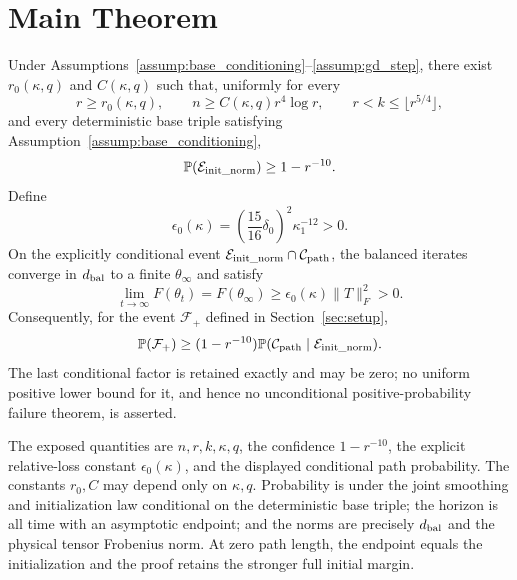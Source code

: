 \section{Main Theorem}\label{sec:main-theorem}

\begin{theorem}
\label{thm:main}
Under Assumptions~\ref{assump:base_conditioning}--\ref{assump:gd_step}, there
exist $r_0(\kappa,q)$ and $C(\kappa,q)$ such that, uniformly for every
\[
  r\ge r_0(\kappa,q),\qquad
  n\ge C(\kappa,q)r^4\log r,\qquad
  r<k\le\lfloor r^{5/4}\rfloor,
\]
and every deterministic base triple satisfying
Assumption~\ref{assump:base_conditioning},
\[
  \mathbb P(\mathcal E_{\rm init\_norm})\ge1-r^{-10}.
\]
Define
\[
  \epsilon_0(\kappa)
  =\left(\frac{15}{16}\delta_0\right)^2\kappa_1^{-12}>0.
\]
On the explicitly conditional event
$\mathcal E_{\rm init\_norm}\cap\mathcal C_{\rm path}$, the balanced iterates
converge in $d_{\rm bal}$ to a finite $\theta_\infty$ and satisfy
\[
  \lim_{t\to\infty}F(\theta_t)
  =F(\theta_\infty)
  \ge\epsilon_0(\kappa)\|T\|_F^2>0.
\]
Consequently, for the event $\mathcal F_+$ defined in Section~\ref{sec:setup},
\[
  \mathbb P(\mathcal F_+)
  \ge(1-r^{-10})
    \mathbb P(\mathcal C_{\rm path}\mid
      \mathcal E_{\rm init\_norm}).
\]
The last conditional factor is retained exactly and may be zero; no uniform
positive lower bound for it, and hence no unconditional positive-probability
failure theorem, is asserted.
\end{theorem}

The exposed quantities are $n,r,k,\kappa,q$, the confidence $1-r^{-10}$,
the explicit relative-loss constant $\epsilon_0(\kappa)$, and the displayed
conditional path probability.  The constants $r_0,C$ may depend only on
$\kappa,q$.  Probability is under the joint smoothing and initialization law
conditional on the deterministic base triple; the horizon is all time with an
asymptotic endpoint; and the norms are precisely $d_{\rm bal}$ and the physical
tensor Frobenius norm.  At zero path length, the endpoint equals the
initialization and the proof retains the stronger full initial margin.
